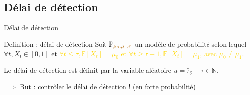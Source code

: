 \documentclass[11pt,french,ignorenonframetext,]{beamer}
\begin{document}
\subsection{\hfill{}Délai de détection\hfill{}}

\begin{frame}{Délai de détection}


  \begin{block}{Definition : délai de détection}
    Soit $\mathbb{P}_{\textcolor{gold}{\mu_0,\mu_1,\tau}}$ un modèle de probabilité selon lequel $\forall t, X_t \in[0,1]$ et \textcolor{gold}{$\forall t \leq \tau, \mathbb{E}[X_t] = \mu_0$ et $\forall t \geq \tau + 1, \mathbb{E}[X_t] = \mu_1$,
    avec $\mu_0 \neq \mu_1$}.
    \vspace*{10pt}


    Le \alert{délai de détection} est définit par la variable aléatoire $u = \widehat{\tau}_{\delta} - \tau \in\mathbb{N}$.
  \end{block}

  \alert{$\implies$ But : contrôler le délai de détection !} (en forte probabilité)

\end{frame}
\end{document}
